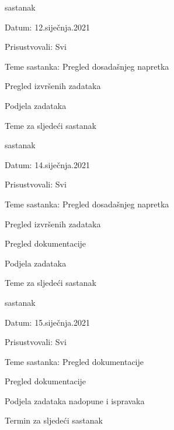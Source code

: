 \begin{packed_enum}
			\item  sastanak
			\item[] \begin{packed_item}
				\item Datum: 12.siječnja.2021
				\item Prisustvovali: Svi
				\item Teme sastanka: Pregled dosadašnjeg napretka
				\begin{packed_item}
				    \item Pregled izvršenih zadataka
					\item Podjela zadataka
					\item Teme za sljedeći sastanak
				\end{packed_item}
			\end{packed_item}
			
			\item  sastanak
			\item[] \begin{packed_item}
				\item Datum: 14.siječnja.2021
				\item Prisustvovali: Svi
				\item Teme sastanka: Pregled dosadašnjeg napretka
				\begin{packed_item}
				    \item Pregled izvršenih zadataka
				    \item Pregled dokumentacije
					\item Podjela zadataka
					\item Teme za sljedeći sastanak
				\end{packed_item}
			\end{packed_item}
			
				\item  sastanak
			\item[] \begin{packed_item}
				\item Datum: 15.siječnja.2021
				\item Prisustvovali: Svi
				\item Teme sastanka: Pregled dokumentacije
				\begin{packed_item}
				    \item Pregled dokumentacije
					\item Podjela zadataka nadopune i ispravaka
					\item Termin za sljedeći sastanak
				\end{packed_item}
			\end{packed_item}
			

\end{packed_enum}
